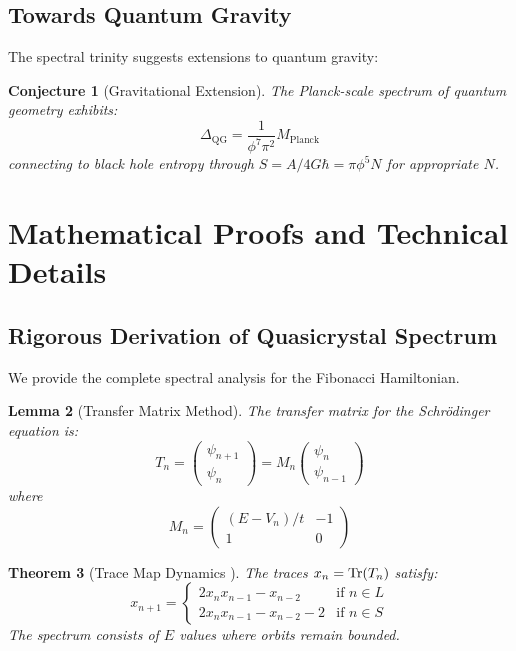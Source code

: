 \documentclass[12pt]{article}
\newtheorem{theorem}{Theorem}[section]
\newtheorem{lemma}[theorem]{Lemma}
\newtheorem{conjecture}[theorem]{Conjecture}
\begin{document}
\subsection{Towards Quantum Gravity}

The spectral trinity suggests extensions to quantum gravity:

\begin{conjecture}[Gravitational Extension]
The Planck-scale spectrum of quantum geometry exhibits:
\begin{equation}
\Delta_{\text{QG}} = \frac{1}{\phi^7 \pi^2} M_{\text{Planck}}
\end{equation}
connecting to black hole entropy through $S = A/4G\hbar = \pi \phi^5 N$ for appropriate $N$.
\end{conjecture}

\section{Mathematical Proofs and Technical Details}

\subsection{Rigorous Derivation of Quasicrystal Spectrum}

We provide the complete spectral analysis for the Fibonacci Hamiltonian.

\begin{lemma}[Transfer Matrix Method]
The transfer matrix for the Schrödinger equation is:
\begin{equation}
T_n = \begin{pmatrix}
\psi_{n+1} \\
\psi_n
\end{pmatrix} = M_n \begin{pmatrix}
\psi_n \\
\psi_{n-1}
\end{pmatrix}
\end{equation}
where
\begin{equation}
M_n = \begin{pmatrix}
(E - V_n)/t & -1 \\
1 & 0
\end{pmatrix}
\end{equation}
\end{lemma}

\begin{theorem}[Trace Map Dynamics \cite{kohmoto1983}]
The traces $x_n = \Tr(T_n)$ satisfy:
\begin{equation}
x_{n+1} = \begin{cases}
2x_n x_{n-1} - x_{n-2} & \text{if } n \in L \\
2x_n x_{n-1} - x_{n-2} - 2 & \text{if } n \in S
\end{cases}
\end{equation}
The spectrum consists of $E$ values where orbits remain bounded.
\end{theorem}
\end{document}
